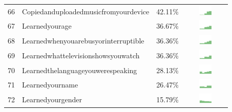 \documentclass[a4paper,12pt]{article}
\begin{document}
\begin{longtable}{| p{0.5cm} | p{7cm} | p{1cm} | c |}
66 & Copiedanduploadedmusicfromyourdevice & 42.11\% & \includegraphics[width = 2cm, height = 0.5cm]{copiedanduploadedmusicfromyourdeviceWORKCONTACTS} \\  
67 & Learnedyourage & 36.67\% & \includegraphics[width = 2cm, height = 0.5cm]{learnedyourageWORKCONTACTS} \\  
68 & Learnedwhenyouarebusyorinterruptible & 36.36\% & \includegraphics[width = 2cm, height = 0.5cm]{learnedwhenyouarebusyorinterruptibleWORKCONTACTS} \\  
69 & Learnedwhattelevisionshowsyouwatch & 36.36\% & \includegraphics[width = 2cm, height = 0.5cm]{learnedwhattelevisionshowsyouwatchWORKCONTACTS} \\  
70 & Learnedthelanguageyouwerespeaking & 28.13\% & \includegraphics[width = 2cm, height = 0.5cm]{learnedthelanguageyouwerespeakingWORKCONTACTS} \\  
71 & Learnedyourname & 26.47\% & \includegraphics[width = 2cm, height = 0.5cm]{learnedyournameWORKCONTACTS} \\  
72 & Learnedyourgender & 15.79\% & \includegraphics[width = 2cm, height = 0.5cm]{learnedyourgenderWORKCONTACTS} \\  
\end{longtable}
\end{document}
